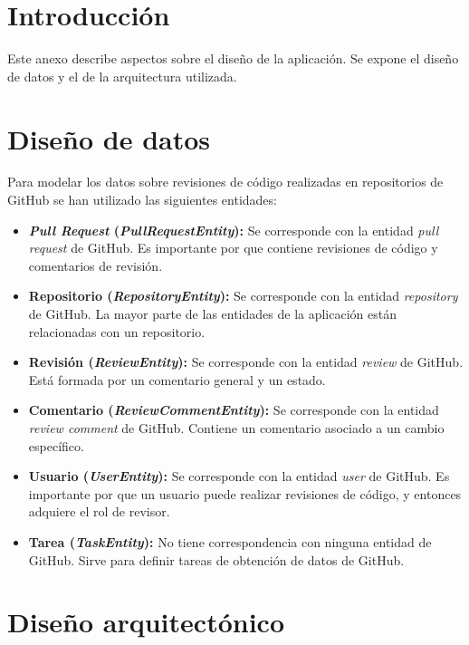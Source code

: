 
\section{Introducción}

Este anexo describe aspectos sobre el diseño de la aplicación. Se expone el diseño de datos y el de la arquitectura utilizada.

\section{Diseño de datos}

Para modelar los datos sobre revisiones de código realizadas en repositorios de GitHub se han utilizado las siguientes entidades:

\begin{itemize}
	\item \textbf{\textit{Pull Request} (\textit{PullRequestEntity}):} Se corresponde con la entidad \textit{pull request} de GitHub. Es importante por que contiene revisiones de código y comentarios de revisión.
	\item \textbf{Repositorio (\textit{RepositoryEntity}):} Se corresponde con la entidad \textit{repository} de GitHub. La mayor parte de las entidades de la aplicación están relacionadas con un repositorio.
	\item \textbf{Revisión (\textit{ReviewEntity}):} Se corresponde con la entidad \textit{review} de GitHub. Está formada por un comentario general y un estado.
	\item \textbf{Comentario (\textit{ReviewCommentEntity}):} Se corresponde con la entidad \textit{review comment} de GitHub. Contiene un comentario asociado a un cambio específico.
	\item \textbf{Usuario (\textit{UserEntity}):} Se corresponde con la entidad \textit{user} de GitHub. Es importante por que un usuario puede realizar revisiones de código, y entonces adquiere el rol de revisor.
	\item \textbf{Tarea (\textit{TaskEntity}):} No tiene correspondencia con ninguna entidad de GitHub. Sirve para definir tareas de obtención de datos de GitHub.
\end{itemize}


\section{Diseño arquitectónico}

